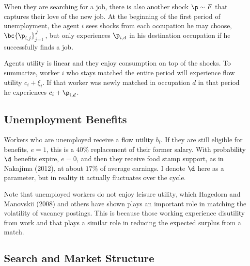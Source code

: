 \documentclass[12pt]{article}
\newcommand{\CiteReference}{../reference.bib}
\newcommand{\highlightP}[1]{{\emph{\color{MyPink}{#1}}}}
\theoremstyle{definition}
\begin{document}
When they are searching for a job, there is also another shock $\p \sim F$ that captures their love of the new job. At the beginning of the first period of unemployment, the agent $i$ sees shocks from each occupation he may choose, $\bc{\p_{i,j}}_{j = 1}^{J}$, but only experiences $\p_{i,d}$ in his destination occupation if he successfully finds a job. \highlightP{This preference shock is crucial as it drives gross flows that are far larger than net flows. Its implication is that workers with observably similar characteristics, namely the same occupational work history, have different job finding rates.}

Agents utility is linear and they enjoy consumption on top of the shocks. To summarize, worker $i$ who stays matched the entire period will experience flow utility $c_i + \xi_i$. If that worker was newly matched in occupation $d$ in that period he experiences $c_i + \p_{i,d}$.

\subsection{Unemployment Benefits}

Workers who are unemployed receive a flow utility $b_i$. If they are still eligible for benefits, $e = 1$, this is a $40\%$ replacement of their former salary. With probability $\d$ benefits expire, $e = 0$, and then they receive food stamp support, as in Nakajima (2012), at about $17\%$ of average earnings. \highlightP{This random expiration saves unemployment duration from becoming a state.} I denote $\d$ here as a parameter, but in reality it actually fluctuates over the cycle.

Note that unemployed workers do not enjoy leisure utility, which Hagedorn and Manovskii (2008) and others have shown plays an important role in matching the volatility of vacancy postings. This is because those working experience disutility from work and that plays a  similar role in reducing the expected surplus from a match.

\subsection{Search and Market Structure}















 
\end{document}
